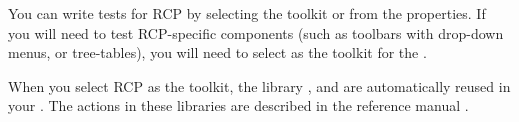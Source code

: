 You can write tests for RCP \gdauts{} by selecting the toolkit  or  from the \gdproject{} properties. If you will need to test RCP-specific components (such as toolbars with drop-down menus, or tree-tables), you will need to select  as the toolkit for the \gdproject{}. 
 
When you select RCP as the \gdproject{} toolkit, the library \gdprojects{} ,  and  are automatically reused in your \gdproject{}. The actions in these libraries are described in the reference manual .

